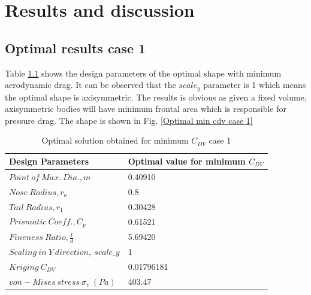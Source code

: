 \chapter{Results and discussion}
\label{Final results}

\section{Optimal results case 1}

Table \ref{optimal solution obtained} shows the design parameters of the optimal shape with minimum aerodynamic drag. It can be observed that the $ scale_y $ parameter is 1 which means the optimal shape is axisymmetric. The results is obvious as given a fixed volume, axisymmetric bodies will have minimum frontal area which is responsible for pressure drag. The shape is shown in Fig. \ref{Optimal min cdv case 1}

\begin{table}[H]
	\centering
	\caption{Optimal solution obtained for minimum $ C_{DV} $ case 1}
	\label{optimal solution obtained}
	\begin{tabular}{ll}
		\hline \hline
		Design Parameters & Optimal value for minimum $ C_{DV} $    \\ \hline \hline
		
		$ Point\ of\ Max.\ Dia., m$ & 0.40910      \\  
		$ Nose\ Radius, r _{o} $ & 0.8    \\
		$ Tail\ Radius, r _{1} $ & 0.30428     \\  
		$ Prismatic\ Coeff., C _{p }$ & 0.61521 \\
		$ Fineness\ Ratio, \frac{l}{d} $ &5.69420 \\
		$Scaling\ in\ Y\ direction,\ scale\_y$ & 1 \\
		\hline \hline
		
		$ Kriging\ C_{DV} $ & 0.01796181 \\
		$ von-Mises\ stress\ \sigma _{v}\ (Pa) $ & 403.47 \\ \hline \hline
	\end{tabular}
\end{table}

